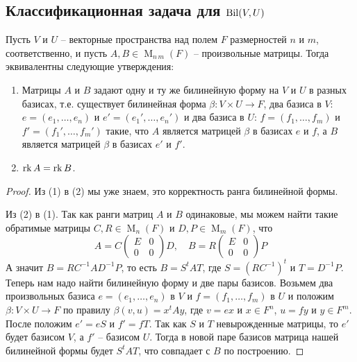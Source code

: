 \subsection{Классификационная задача для $\operatorname{Bil}(V,U)$}

\begin{claim}
Пусть $V$ и $U$ -- векторные пространства над полем $F$ размерностей $n$ и $m$, соответственно, и пусть $A,B\in \operatorname{M}_{n\,m}(F)$ -- произвольные матрицы.
Тогда эквивалентны следующие утверждения:
\begin{enumerate}
\item Матрицы $A$ и $B$ задают одну и ту же билинейную форму на $V$ и $U$ в разных базисах, т.е. существует билинейная форма $\beta\colon V\times U\to F$, два базиса в $V$: $e=(e_1,\ldots,e_n)$ и $e'=(e_1',\ldots,e_n')$ и два базиса в $U$: $f=(f_1,\ldots,f_m)$ и $f'=(f_1',\ldots,f_m')$ такие, что $A$ является матрицей $\beta$ в базисах $e$ и $f$, а $B$ является матрицей $\beta$ в базисах $e'$ и $f'$.

\item $\operatorname{rk} A = \operatorname{rk} B$.
\end{enumerate}
\end{claim}
\begin{proof}
Из (1) в (2) мы уже знаем, это корректность ранга билинейной формы.

Из (2) в (1).
Так как ранги матриц $A$ и $B$ одинаковые, мы можем найти такие обратимые матрицы $C,R \in \operatorname{M}_{n}(F)$ и $D, P\in \operatorname{M}_{m}(F)$, что
\[
A = C
\begin{pmatrix}
{E}&{0}\\
{0}&{0}
\end{pmatrix}
D,
\quad
B = R
\begin{pmatrix}
{E}&{0}\\
{0}&{0}
\end{pmatrix}
P
\]
А значит $B = RC^{-1}AD^{-1}P$, то есть $B = S^t A T$, где $S = (RC^{-1})^t$ и $T = D^{-1}P$.
Теперь нам надо найти билинейную форму  и две пары базисов.
Возьмем два произвольных базиса $e=(e_1,\ldots,e_n)$ в $V$ и $f=(f_1,\ldots,f_m)$ в $U$ и положим $\beta\colon V\times U \to F$ по правилу $\beta(v, u) = x^t A y$, где $v = ex$ и $x\in F^n$, $u = f y$ и $y\in F^m$.
После положим $e' = e S$ и $f' = fT$.
Так как $S$ и $T$ невырожденные матрицы, то $e'$ будет базисом $V$, а $f'$ -- базисом $U$.
Тогда в новой паре базисов матрица нашей билинейной формы будет $S^t A T$, что совпадает с $B$ по построению.
\end{proof}

